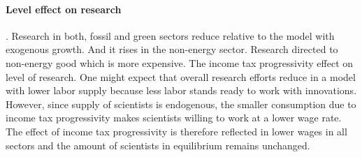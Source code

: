 \documentclass[12pt]{article}
\begin{document}
\paragraph{Level effect on research}. Research in both, fossil and green sectors reduce relative to the model with exogenous growth. And it rises in the non-energy sector. Research directed to non-energy good which is more expensive.
The income tax progressivity effect on level of research. One might expect that overall research efforts reduce in a model with lower labor supply because less labor stands ready to work with innovations. However, since supply of scientists is endogenous, the smaller consumption due to income tax progressivity makes scientists willing to work at a lower wage rate. The effect of income tax progressivity is therefore reflected in lower wages in all sectors and the amount of scientists in equilibrium remains unchanged. 
\end{document}
